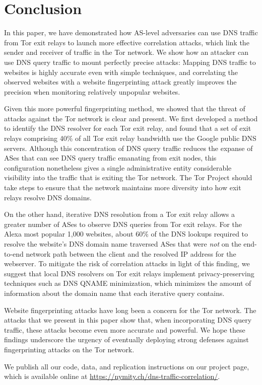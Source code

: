 \section{Conclusion}
\label{sec:conclusion}

In this paper, we have demonstrated how AS-level adversaries can use DNS
traffic from Tor exit relays to launch more effective correlation
attacks, which link the sender and receiver of traffic in the Tor
network.  We show how an attacker can use DNS query traffic to mount
perfectly precise \name attacks: Mapping DNS traffic to websites is highly
accurate even with simple techniques, and correlating the observed websites
with a website fingerprinting attack greatly improves the precision when
monitoring relatively unpopular websites. 

Given this more powerful fingerprinting method, we showed that the
threat of \name attacks against the Tor network is clear and present. We
first developed a method to identify the DNS resolver for each Tor exit relay,
and found that a set of exit relays comprising 40\% of all Tor exit
relay bandwidth use the Google public DNS servers. Although this
concentration of DNS query traffic reduces the expanse of ASes that can
see DNS query traffic emanating from exit nodes, this configuration
nonetheless gives a single administrative entity considerable visibility
into the traffic that is exiting the Tor network. The Tor Project should
take steps to ensure that the network maintains more diversity into how
exit relays resolve DNS domains.

On the other hand, iterative DNS resolution from a Tor exit relay allows
a greater number of ASes to observe DNS queries from Tor exit relays.
For the Alexa most popular 1,000 websites, about 60\% of the DNS lookups
required to resolve the website's DNS domain name traversed ASes that
were {\em not} on the end-to-end network path between the client and the
resolved IP address for the webserver.  To mitigate the risk of
correlation attacks in light of this finding, we suggest that local DNS
resolvers on Tor exit relays implement privacy-preserving techniques
such as DNS QNAME minimization, which minimizes the amount of
information about the domain name that each iterative query contains.

Website fingerprinting attacks have long been a concern for the Tor
network. The attacks that we present in this paper show that, when
incorporating DNS query traffic, these attacks become even more accurate
and powerful. We hope these findings underscore the urgency of
eventually deploying strong defenses against fingerprinting attacks on
the Tor network.

We publish all our code, data, and replication instructions on our project page,
which is available online at \url{https://nymity.ch/dns-traffic-correlation/}.
